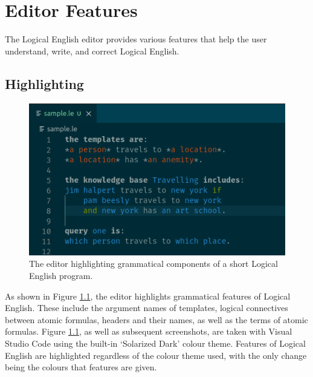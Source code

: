 \documentclass[../main.tex]{subfiles}
\begin{document}
\chapter{Editor Features}
\label{chapter:editor-featres}

The Logical English editor provides various features that help the user understand, write, and correct Logical English. 
\section{Highlighting}
\begin{figure}[h!]
\centering
\includegraphics[width = \linewidth]{./figures/highlighting.png}
\caption{The editor highlighting grammatical components of a short Logical English program.}
\label{fig:highlighting}
\end{figure}
As shown in Figure \ref{fig:highlighting}, the editor highlights grammatical features of Logical English. These include the argument names of templates, logical connectives between atomic formulas, headers and their names, as well as the terms of atomic formulas. Figure \ref{fig:highlighting}, as well as subsequent screenshots, are taken with Visual Studio Code using the built-in `Solarized Dark' colour theme. Features of Logical English are highlighted regardless of the colour theme used, with the only change being the colours that features are given.
\end{document}
